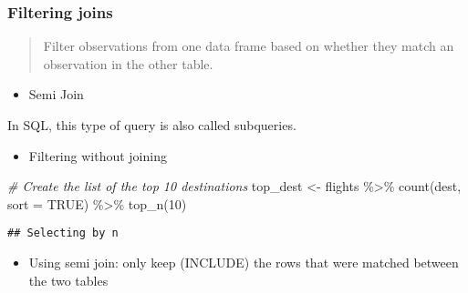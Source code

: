 \documentclass[
]{book}
\newenvironment{Shaded}{\begin{snugshade}}{\end{snugshade}}
\newcommand{\AttributeTok}[1]{\textcolor[rgb]{0.77,0.63,0.00}{#1}}
\newcommand{\CommentTok}[1]{\textcolor[rgb]{0.56,0.35,0.01}{\textit{#1}}}
\newcommand{\ConstantTok}[1]{\textcolor[rgb]{0.00,0.00,0.00}{#1}}
\newcommand{\DecValTok}[1]{\textcolor[rgb]{0.00,0.00,0.81}{#1}}
\newcommand{\FunctionTok}[1]{\textcolor[rgb]{0.00,0.00,0.00}{#1}}
\newcommand{\NormalTok}[1]{#1}
\newcommand{\OtherTok}[1]{\textcolor[rgb]{0.56,0.35,0.01}{#1}}
\newcommand{\SpecialCharTok}[1]{\textcolor[rgb]{0.00,0.00,0.00}{#1}}
\providecommand{\tightlist}{%
  \setlength{\itemsep}{0pt}\setlength{\parskip}{0pt}}
\begin{document}
\hypertarget{filtering-joins}{%
\subsubsection{Filtering joins}\label{filtering-joins}}

\begin{quote}
Filter observations from one data frame based on whether they match an observation in the other table.
\end{quote}

\begin{itemize}
\tightlist
\item
  Semi Join
\end{itemize}

In SQL, this type of query is also called subqueries.

\begin{itemize}
\tightlist
\item
  Filtering without joining
\end{itemize}

\begin{Shaded}
\begin{Highlighting}[]
\CommentTok{\# Create the list of the top 10 destinations}
\NormalTok{top\_dest }\OtherTok{\textless{}{-}}\NormalTok{ flights }\SpecialCharTok{\%\textgreater{}\%}
  \FunctionTok{count}\NormalTok{(dest, }\AttributeTok{sort =} \ConstantTok{TRUE}\NormalTok{) }\SpecialCharTok{\%\textgreater{}\%}
  \FunctionTok{top\_n}\NormalTok{(}\DecValTok{10}\NormalTok{)}
\end{Highlighting}
\end{Shaded}

\begin{verbatim}
## Selecting by n
\end{verbatim}

\begin{Shaded}
\end{Shaded}

\begin{itemize}
\tightlist
\item
  Using semi join: only keep (INCLUDE) the rows that were matched between the two tables
\end{itemize}
\end{document}
